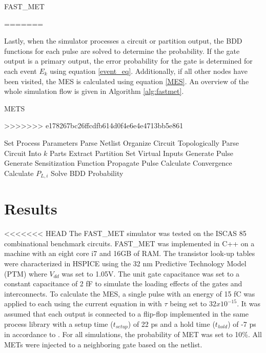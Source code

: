 \documentclass[conference]{IEEEtran}
\begin{document}
\begin{algorithm}
	\caption{FAST\_MET} \label{alg:fastmet}
=======
\setlength{\abovecaptionskip}{5pt}

\setlength{\belowcaptionskip}{5pt}

Lastly, when the simulator processes a circuit or partition output, the BDD functions for each pulse are solved to determine the probability. If the gate output is a primary output, the error probability for the gate is determined for each event $E_k$ using equation \ref{event_eq}. Additionally, if all other nodes have been visited, the MES is calculated using equation \ref{MES}. An overview of the whole simulation flow is given in Algorithm \ref{alg:fastmet}.

\begin{algorithm}
	\caption{METS} \label{alg:fastmet}
>>>>>>> e178267bc26ffcdfb614d0f4e6e4e4713bb5e861
	\begin{algorithmic} [1]
		\STATE Set Process Parameters
		\STATE Parse Netlist
		\STATE Organize Circuit Topologically
		\STATE Parse Circuit Into $k$ Parts
		\STATE Extract Partition
		\STATE Set Virtual Inputs
		\STATE Generate Pulse
		\STATE Generate Sensitization Function
		\STATE Propagate Pulse
		\STATE Calculate Convergence
		\STATE Calculate $P_{L,i}$
		\STATE Solve BDD Probability
		\ENDIF
		\ENDFOR
		\ENDFOR		
	\end{algorithmic}
\end{algorithm}

\section{Results} \label{results}

<<<<<<< HEAD
The FAST\_MET simulator was tested on the ISCAS 85 combinational benchmark circuits. FAST\_MET was implemented in C++ on a machine with an eight core i7 and 16GB of RAM. The transistor look-up tables were characterized in HSPICE using the 32 nm Predictive Technology Model (PTM) \cite{PTM} where $V_{dd}$ was set to 1.05V. The unit gate capacitance was set to a constant capacitance of 2 fF to simulate the loading effects of the gates and interconnects. To calculate the MES, a single pulse with an energy of 15 fC was applied to each using the current equation in \cite{Ziegler1996} with $\tau$ being set to $32x10^{-15}$. It was assumed that each output is connected to a flip-flop implemented in the same process library with a setup time ($t_{setup}$) of 22 ps and a hold time ($t_{hold}$) of -7 ps in accordance to \cite{Nunes2013}. For all simulations, the probability of MET was set to 10\%. All METs were injected to a neighboring gate based on the netlist.


\end{algorithm}
\end{document}
